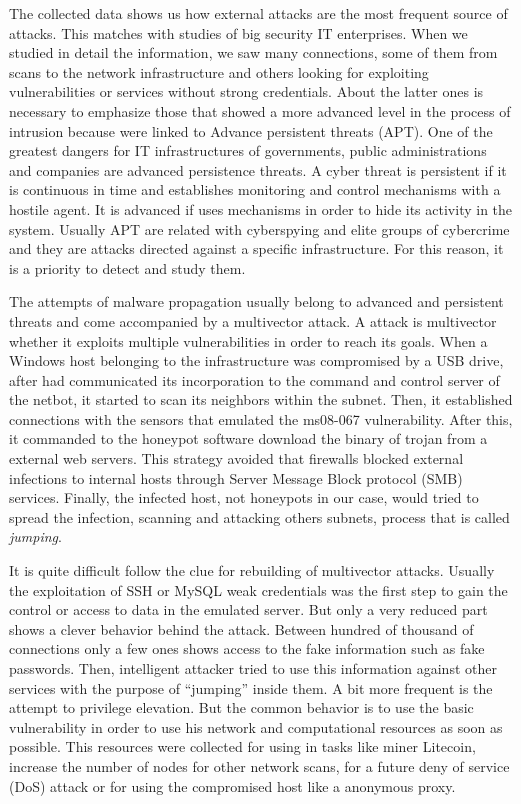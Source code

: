 \documentclass[a4paper]{llncs}
\begin{document}
The collected data shows us how external attacks are the most frequent source of attacks. This matches with studies of big security IT enterprises\cite{verizon-2015}. When we studied in detail the information, we saw many connections, some of them from scans to the network infrastructure and others looking for exploiting vulnerabilities or services without strong credentials. About the latter ones is necessary to emphasize those that showed a more advanced level in the process of intrusion because were linked to Advance persistent threats (APT). One of the greatest dangers for IT infrastructures of governments, public administrations and companies are advanced persistence threats. A cyber threat is persistent if it is continuous in time and establishes monitoring and control mechanisms with a hostile agent. It is advanced if uses mechanisms in order to hide its activity in the system. Usually APT are related with cyberspying and elite groups of cybercrime and they are attacks directed against a specific infrastructure. For this reason, it is a priority to detect and study them.

The attempts of malware propagation usually belong to advanced and persistent threats and come accompanied by a multivector attack. A attack is multivector whether it exploits multiple vulnerabilities in order to reach its goals. When a Windows host belonging to the infrastructure was compromised by a USB drive, after had communicated its incorporation to the command and control server of the netbot, it started to scan its neighbors within the subnet. Then, it established connections with the sensors that  emulated the ms08-067\cite{ms08067} vulnerability. After this, it commanded to the honeypot software download the binary of trojan from a external web servers. This strategy avoided that firewalls blocked external infections to internal hosts through Server Message Block protocol (SMB) services. Finally, the infected host, not honeypots in our case, would tried to spread the infection, scanning and attacking others subnets, process that is called {\it jumping}.

It is quite difficult follow the clue for rebuilding of multivector attacks. Usually the exploitation of SSH or MySQL weak credentials was the first step to gain the control or access to data in the emulated server. But only a very reduced part shows a clever behavior behind the attack. Between hundred of thousand of connections only a few ones shows access to the fake information such as fake passwords. Then, intelligent attacker tried to use this information against other services with the purpose of  ``jumping'' inside them. A bit more frequent is the attempt to privilege elevation. But the common behavior is to use the basic vulnerability in order to use his network and computational resources as soon as possible. This resources were collected for using in tasks like miner Litecoin\cite{litecoin}, increase the number of nodes for other network scans, for a future deny of service (DoS) attack or for using the compromised host like a anonymous proxy.
\end{document}
